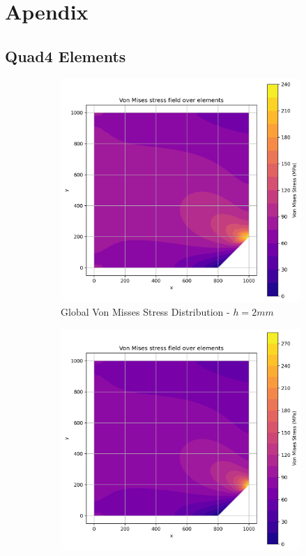 \section{Apendix}

\subsection{Quad4 Elements}

\begin{figure}[H]
  \centering
  \begin{subfigure}[b]{0.45\textwidth}
    \centering
    \includegraphics[width=\textwidth]{GRAFICOS/Quad4/2mm_global/resultados_von_mises.png}
    \caption{Global Von Misses Stress Distribution - $h=2mm$}
    \label{fig:img1}
  \end{subfigure}
  \hfill
  \begin{subfigure}[b]{0.45\textwidth}
    \centering
    \includegraphics[width=\textwidth]{GRAFICOS/Quad4/2mm_local/resultados_von_mises.png}

\end{subfigure}
\end{figure}

